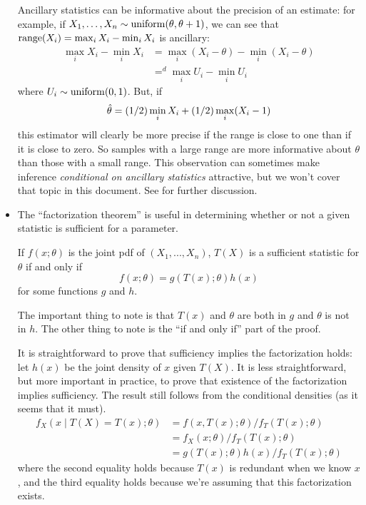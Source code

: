 \begin{itemize}
  Ancillary statistics can be informative about the precision of an
  estimate: for example, if $X_1,\ldots,X_n \sim \operatorname{uniform}(\theta,\theta+1)$, we can
  see that $\operatorname{range}(X_i) = \max_i X_i - \min_i X_i$ is ancillary:
  \begin{align*}
    \max_i X_i - \min_i X_i
    &= \max_i (X_i - \theta) - \min_i (X_i - \theta) \\
    &=^d \max_i U_i - \min_i U_i
  \end{align*}
  where $U_i \sim \operatorname{uniform}(0, 1)$.  But, if
  \begin{equation*}
    \hat{\theta} = (1/2) \min_i X_i + (1/2) \max_i (X_i - 1)
  \end{equation*}
  this estimator will clearly be more precise if the range is close to
  one than if it is close to zero.  So samples with a large range are
  more informative about $\theta$ than those with a small range.  This
  observation can sometimes make inference \emph{conditional on
  ancillary statistics} attractive, but we won't cover that topic in
  this document.  See \citet[Chapter 10]{LR:05} for further discussion.

\item The ``factorization theorem'' is useful in determining whether
  or not a given statistic is sufficient for a parameter.
  \begin{thm}
    If $f(x; \theta)$ is the joint pdf of $(X_1,...,X_n)$, $T(X)$ is a
    sufficient statistic for $\theta$ if and only if
    \begin{equation*}
      f(x; \theta) = g(T(x); \theta) h(x)
    \end{equation*}
    for some functions $g$ and $h$.
  \end{thm}
  The important thing to note is that $T(x)$ and $\theta$ are both in $g$
  and $\theta$ is not in $h$.  The other thing to note is the ``if and only
  if'' part of the proof.

  It is straightforward to prove that sufficiency implies the
  factorization holds: let $h(x)$ be the joint density of $x$ given
  $T(X)$.  It is less straightforward, but more important in practice,
  to prove that existence of the factorization implies sufficiency.
  The result still follows from the conditional densities (as it seems
  that it must).
  \begin{align*}
    f_X(x \mid T(X) = T(x); \theta)
    &= f(x, T(x); \theta) / f_T(T(x); \theta) \\
    &= f_X(x; \theta) / f_T(T(x); \theta) \\
    &= g(T(x); \theta) h(x) / f_T(T(x); \theta)
  \end{align*}
  where the second equality holds because $T(x)$ is redundant when we
  know $x$, and the third equality holds because we're assuming that
  this factorization exists.


\end{itemize}
